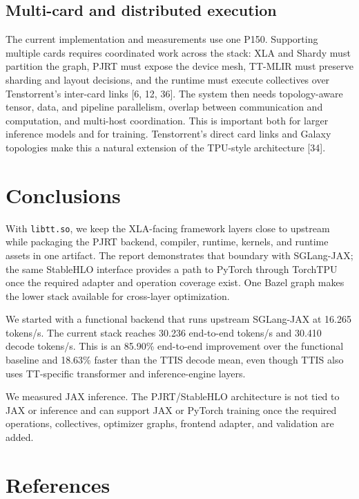 \documentclass[
  10pt,
  american,
  10pt,
  letterpaper]{article}
\begin{document}
\hypertarget{multi-card-and-distributed-execution}{%
\subsection{Multi-card and distributed
execution}\label{multi-card-and-distributed-execution}}

The current implementation and measurements use one P150. Supporting
multiple cards requires coordinated work across the stack: XLA and
Shardy must partition the graph, PJRT must expose the device mesh,
TT-MLIR must preserve sharding and layout decisions, and the runtime
must execute collectives over Tenstorrent's inter-card links {[}6, 12,
36{]}. The system then needs topology-aware tensor, data, and pipeline
parallelism, overlap between communication and computation, and
multi-host coordination. This is important both for larger inference
models and for training. Tenstorrent's direct card links and Galaxy
topologies make this a natural extension of the TPU-style architecture
{[}34{]}.

\hypertarget{conclusions}{%
\section{Conclusions}\label{conclusions}}

With \texttt{libtt.so}, we keep the XLA-facing framework layers close to
upstream while packaging the PJRT backend, compiler, runtime, kernels,
and runtime assets in one artifact. The report demonstrates that
boundary with SGLang-JAX; the same StableHLO interface provides a path
to PyTorch through TorchTPU once the required adapter and operation
coverage exist. One Bazel graph makes the lower stack available for
cross-layer optimization.

We started with a functional backend that runs upstream SGLang-JAX at
16.265 tokens/s. The current stack reaches 30.236 end-to-end tokens/s
and 30.410 decode tokens/s. This is an 85.90\% end-to-end improvement
over the functional baseline and 18.63\% faster than the TTIS decode
mean, even though TTIS also uses TT-specific transformer and
inference-engine layers.

We measured JAX inference. The PJRT/StableHLO architecture is not tied
to JAX or inference and can support JAX or PyTorch training once the
required operations, collectives, optimizer graphs, frontend adapter,
and validation are added.

\hypertarget{references}{%
\section*{References}\label{references}}
\end{document}
